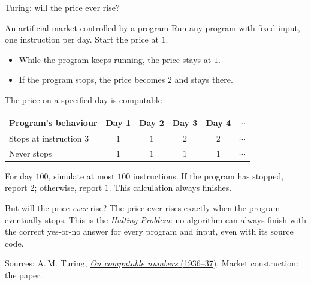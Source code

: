 \documentclass{beamer}
\newcommand{\doiref}[2]{%
  \href{https://doi.org/#1}{\textcolor{blue!65!black}{#2}}}
\newcommand{\sourcefoot}[1]{%
  \par\vfill{\fontsize{6.3}{7.5}\selectfont\color{black!65}Sources: #1\par}}
\begin{document}
\begin{frame}{Turing: will the price ever rise?}
\small

\begin{block}{An artificial market controlled by a program}
Run any program with fixed input, one instruction per day. Start the price at $1$.
\begin{itemize}
\setlength{\itemsep}{0.2em}
\item While the program keeps running, the price stays at $1$.
\item If the program stops, the price becomes $2$ and stays there.
\end{itemize}
\end{block}

\begin{exampleblock}{The price on a specified day is computable}
\centering
\renewcommand{\arraystretch}{1.2}
\begin{tabular}{@{}lccccc@{}}
Program's behaviour & Day 1 & Day 2 & Day 3 & Day 4 & $\cdots$\\\hline
Stops at instruction 3 & $1$ & $1$ & $2$ & $2$ & $\cdots$\\
Never stops            & $1$ & $1$ & $1$ & $1$ & $\cdots$
\end{tabular}
\par\smallskip
\raggedright
For day $100$, simulate at most $100$ instructions.
If the program has stopped, report $2$; otherwise, report $1$.
This calculation always finishes.
\end{exampleblock}

\begin{alertblock}{But will the price \emph{ever} rise?}
The price ever rises exactly when the program eventually stops.
This is the \emph{Halting Problem}: no algorithm can always finish with the
correct yes-or-no answer for every program and input, even with its source code.
\end{alertblock}

\sourcefoot{A.\,M. Turing,
\doiref{10.1112/plms/s2-42.1.230}{\emph{On computable numbers} (1936--37)}.
Market construction: the paper.}
\end{frame}
\end{document}
